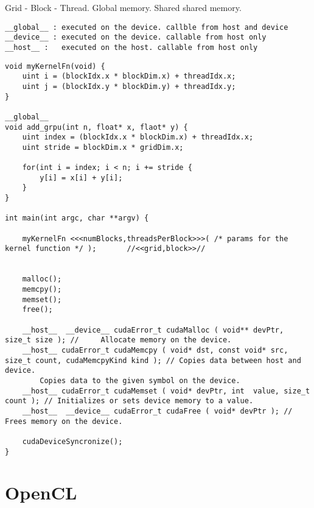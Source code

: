 \documentclass{article}
\begin{document}
\begin{multicols}{2}
Grid - Block - Thread. Global memory. Shared shared memory.


\begin{verbatim}
__global__ : executed on the device. callble from host and device
__device__ : executed on the device. callable from host only
__host__ :   executed on the host. callable from host only
\end{verbatim}


\begin{verbatim}
void myKernelFn(void) {
    uint i = (blockIdx.x * blockDim.x) + threadIdx.x;
    uint j = (blockIdx.y * blockDim.y) + threadIdx.y;
}

__global__
void add_grpu(int n, float* x, flaot* y) {
    uint index = (blockIdx.x * blockDim.x) + threadIdx.x;
    uint stride = blockDim.x * gridDim.x;
    
    for(int i = index; i < n; i += stride {
        y[i] = x[i] + y[i];
    }
}

int main(int argc, char **argv) {    

    myKernelFn <<<numBlocks,threadsPerBlock>>>( /* params for the kernel function */ );       //<<grid,block>>//


    malloc();
    memcpy();
    memset();
    free();

    __host__  __device__ cudaError_t cudaMalloc ( void** devPtr, size_t size ); //     Allocate memory on the device. 
    __host__ cudaError_t cudaMemcpy ( void* dst, const void* src, size_t count, cudaMemcpyKind kind ); // Copies data between host and device. 
        Copies data to the given symbol on the device. 
    __host__ cudaError_t cudaMemset ( void* devPtr, int  value, size_t count ); // Initializes or sets device memory to a value. 
    __host__  __device__ cudaError_t cudaFree ( void* devPtr ); // Frees memory on the device. 
    
    cudaDeviceSyncronize();
}
\end{verbatim}

\section{OpenCL}


\end{multicols}
\end{document}
